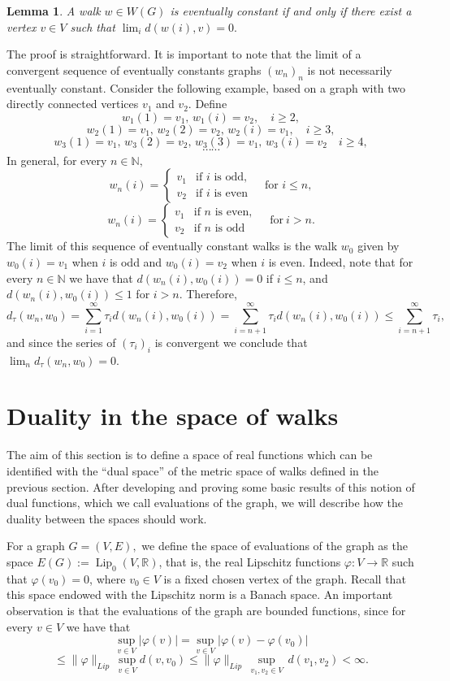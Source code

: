 \documentclass[preprint,12pt]{elsarticle}
\newtheorem{lemma}[theorem]{Lemma}
\begin{document}
\begin{lemma}
A walk $w\in W(G)$ is eventually constant if and only if there exist a vertex $v \in V$ such that $\lim_i d(w(i),v) = 0.$
\end{lemma}
The proof is  straightforward.
It is important to note that the limit of a convergent sequence of eventually constants graphs $(w_n)_n$ is not necessarily eventually constant. Consider the following example, based on a graph with two directly connected vertices $v_1$ and $v_2.$ Define
$$
w_1(1)=v_1, \, w_1(i)=v_2, \quad i \ge 2, 
$$
$$
w_2(1)=v_1, \, w_2(2)=v_2, \, w_2(i)=v_1, \quad i \ge 3,
$$  
$$
w_3(1)=v_1, \, w_3(2)=v_2, \, w_3(3)=v_1, \, w_3(i)= v_2 \quad i \ge 4,
$$ 
$$
\cdots \cdots
$$
In general, for every $n \in \mathbb N,$
$$
w_n(i) =
\begin{cases}
v_1 & \text{if } i \text{ is odd}, \\
v_2 & \text{if } i \text{ is even}
\end{cases}
\quad \text{for } i \leq n, 
$$
$$w_n(i) =
\begin{cases}
v_1 & \text{if } n \text{ is even}, \\
v_2 & \text{if } n \text{ is odd}
\end{cases}
\quad \text{for} \ i > n.
$$
The limit of this sequence of eventually constant walks is the walk $w_0$ given by $w_0(i)=v_1$ when $i$ is odd and $w_0(i)=v_2$ when $i$ is even. Indeed, note that for every $n\in\mathbb N$ we have that $d(w_n(i),w_0(i))=0$ if $i\leq n$, and 
$d(w_n(i),w_0(i))\leq 1$ for $i>n$. Therefore, $$d_{\tau}(w_n,w_0)=\sum_{i=1}^\infty \tau_id(w_n(i),w_0(i))=\sum_{i=n+1}^\infty \tau_id(w_n(i),w_0(i))\leq \sum_{i=n+1}^\infty \tau_i,$$
and since the series of $(\tau_i)_i$ is convergent we conclude that $\lim_n d_\tau(w_n,w_0)=0$.

\section{Duality in the space of walks} \label{s3}
The aim of this section is to define a space of real functions which can be identified with the ``dual space'' of the metric space of walks defined in the previous section. After developing and proving some basic results of this notion of dual functions, which we call evaluations of the graph, we will describe how the duality between the spaces should work.


 For a graph $G=(V,E),$ we define the space of evaluations of the graph as the space $E(G):= \operatorname{Lip}_0(V,\mathbb R)$, that is, the real Lipschitz functions $\varphi:V \to \mathbb R$ such that $\varphi(v_0)=0$, where $v_0 \in V$ is a fixed chosen vertex of the graph. Recall that this space endowed with the Lipschitz norm is a Banach space. An important observation is that the evaluations of the graph are bounded functions, since for every $v \in V$ we have that
$$
\sup_{v\in V}|\varphi(v)|=\sup_{v\in V}| \varphi(v)- \varphi(v_0)| 
$$
$$
\le \|\varphi\|_{Lip} \, \sup_{v\in V}d(v,v_0) 
\le \|\varphi\|_{Lip} \, \sup_{v_1,v_2 \in V} \, d(v_1,v_2) < \infty.
$$
\end{document}
